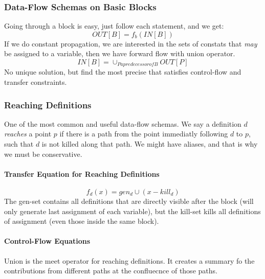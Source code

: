 \documentclass{article}
\begin{document}
\subsubsection{Data-Flow Schemas on Basic Blocks} %
\label{ssub:Data-Flow Schemas on Basic Blocks}
Going through a block is easy, just follow each statement, and we get:
\begin{equation}
	OUT[B] = f_b(IN[B])
\end{equation}
If we do constant propagation, we are interested in the sets of constats that \emph{may} be assigned to a variable, then we have forward flow with union operator.
\begin{equation}
	IN[B] = \cup_{P a predecessor of B}OUT[P]
\end{equation}
No unique solution, but find the most precise that satisfies control-flow and transfer constraints.

\subsubsection{Reaching Definitions} %
\label{ssub:Reaching Definitions}
One of the most common and useful data-flow schemas. We say a definition $d$ \emph{reaches} a point $p$ if there is a path from the point immediatly following $d$ to $p$, such that $d$ is not killed along that path. We might have aliases, and that is why we must be conservative.

\paragraph{Transfer Equation for Reaching Definitions} %
\label{par:Transfer Equation for Reaching Definitions}
\begin{equation}
	f_d(x) = gen_d \cup (x - kill_d)
\end{equation}
The gen-set contains all definitions that are directly visible after the block (will only generate last assignment of each variable), but the kill-set kills all definitions of assignment (even those inside the same block).

\paragraph{Control-Flow Equations} %
\label{par:Control-Flow Equations}
Union is the meet operator for reaching definitions. It creates a summary fo the contributions from different paths at the confluecnce of those paths.
\end{document}
